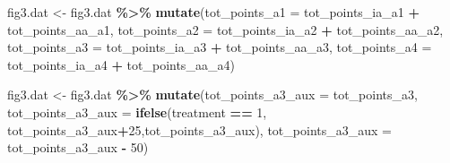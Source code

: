 \documentclass[
]{article}
\newenvironment{Shaded}{\begin{snugshade}}{\end{snugshade}}
\newcommand{\AttributeTok}[1]{\textcolor[rgb]{0.13,0.29,0.53}{#1}}
\newcommand{\DecValTok}[1]{\textcolor[rgb]{0.00,0.00,0.81}{#1}}
\newcommand{\FunctionTok}[1]{\textcolor[rgb]{0.13,0.29,0.53}{\textbf{#1}}}
\newcommand{\NormalTok}[1]{#1}
\newcommand{\OtherTok}[1]{\textcolor[rgb]{0.56,0.35,0.01}{#1}}
\newcommand{\SpecialCharTok}[1]{\textcolor[rgb]{0.81,0.36,0.00}{\textbf{#1}}}
\begin{document}
\begin{Shaded}
\begin{Highlighting}[]
\NormalTok{fig3.dat }\OtherTok{\textless{}{-}}\NormalTok{ fig3.dat }\SpecialCharTok{\%\textgreater{}\%}
  \FunctionTok{mutate}\NormalTok{(}\AttributeTok{tot\_points\_a1 =}\NormalTok{ tot\_points\_ia\_a1 }\SpecialCharTok{+}\NormalTok{ tot\_points\_aa\_a1,}
         \AttributeTok{tot\_points\_a2 =}\NormalTok{ tot\_points\_ia\_a2 }\SpecialCharTok{+}\NormalTok{ tot\_points\_aa\_a2,}
         \AttributeTok{tot\_points\_a3 =}\NormalTok{ tot\_points\_ia\_a3 }\SpecialCharTok{+}\NormalTok{ tot\_points\_aa\_a3,}
         \AttributeTok{tot\_points\_a4 =}\NormalTok{ tot\_points\_ia\_a4 }\SpecialCharTok{+}\NormalTok{ tot\_points\_aa\_a4)}

\NormalTok{fig3.dat }\OtherTok{\textless{}{-}}\NormalTok{ fig3.dat }\SpecialCharTok{\%\textgreater{}\%}
  \FunctionTok{mutate}\NormalTok{(}\AttributeTok{tot\_points\_a3\_aux =}\NormalTok{ tot\_points\_a3,}
         \AttributeTok{tot\_points\_a3\_aux =} \FunctionTok{ifelse}\NormalTok{(treatment }\SpecialCharTok{==} \DecValTok{1}\NormalTok{, tot\_points\_a3\_aux}\SpecialCharTok{+}\DecValTok{25}\NormalTok{,tot\_points\_a3\_aux),}
         \AttributeTok{tot\_points\_a3\_aux =}\NormalTok{ tot\_points\_a3\_aux }\SpecialCharTok{{-}} \DecValTok{50}\NormalTok{)}


\end{Highlighting}
\end{Shaded}
\end{document}
